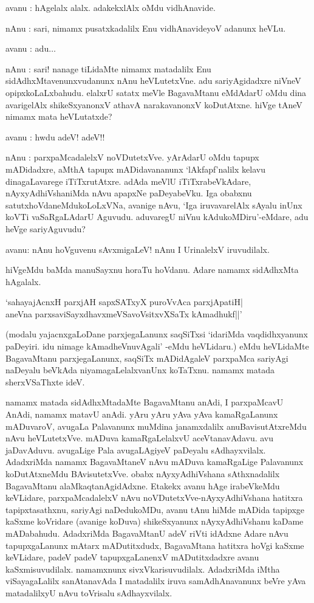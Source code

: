 avanu : hAgelalx alalx. adakekxlAlx oMdu vidhAnavide.

nAnu : sari, nimamx pusatxkadalilx Enu vidhAnavideyoV adanunx heVLu.

avanu : adu$\ldots$ 

nAnu : sari! nanage tiLidaMte nimamx matadalilx Enu sidAdhxMtavenunxvudanunx nAnu heVLutetxVne. adu sariyAgidadxre niVneV opipxkoLaLxbahudu. elalxrU satatx meVle BagavaMtanu eMdAdarU oMdu dina avarigelAlx shikeSxyanonxV athavA narakavanonxV koDutAtxne. hiVge tAneV 
nimamx mata heVLutatxde?

avanu : hwdu adeV! adeV!!

nAnu : parxpaMcadalelxV noVDutetxVve. yArAdarU oMdu tapupx mADidadxre, aMthA tapupx mADidavananunx `lAkfapf'nalilx kelavu dinagaLavarege iTiTxrutAtxre. adAda meVlU iTiTxrabeVkAdare, nAyxyAdhiVshaniMda nAvu apapxNe paDeyabeVku. Iga obabxnu satutxhoVdaneMdukoLoLxVNa, avanige nAvu, `Iga iruvavarelAlx sAyalu inUnx koVTi vaSaRgaLAdarU Aguvudu. aduvaregU niVnu kAdukoMDiru'-eMdare, adu heVge sariyAguvudu?

avanu: nAnu hoVguvenu sAvxmigaLeV! nAnu I UrinalelxV iruvudilalx.

hiVgeMdu baMda manuSayxnu horaTu hoVdanu. Adare namamx sidAdhxMta hAgalalx.

\begin{shloka}
`sahayajAcnxH parxjAH sapxSATxyX puroVvAca parxjApatiH|\\
aneVna parxsaviSayxdhavxmeVSavoV\s sitxvXSaTx kAmadhukf||'
\end{shloka}

(modalu yajacnxgaLoDane parxjegaLanunx saqSiTxsi `idariMda vaqdidhxyanunx paDeyiri. idu nimage kAmadheVnuvAgali' -eMdu heVLidaru.) eMdu heVLidaMte BagavaMtanu parxjegaLanunx, saqSiTx mADidAgaleV parxpaMca sariyAgi naDeyalu beVkAda niyamagaLelalxvanUnx koTaTxnu. 
namamx matada sherxVSaThxte ideV.

namamx matada sidAdhxMtadaMte BagavaMtanu anAdi, I parxpaMcavU AnAdi, namamx matavU anAdi. yAru yAru yAva yAva kamaRgaLanunx mADuvaroV, avugaLa Palavanunx muMdina janamxdalilx anuBavisutAtxreMdu nAvu heVLutetxVve. mADuva kamaRgaLelalxvU aceVtanavAdavu. avu jaDavAduvu. avugaLige Pala avugaLAgiyeV paDeyalu sAdhayxvilalx. AdadxriMda namamx BagavaMtaneV nAvu mADuva kamaRgaLige Palavanunx koDutAtxneMdu BAvisutetxVve. obabx nAyxyAdhiVshana sAthxnadalilx BagavaMtanu alaMkaqtanAgidAdxne. Etakekx avanu hAge irabeVkeMdu 
keVLidare, parxpaMcadalelxV nAvu noVDutetxVve-nAyxyAdhiVshana hatitxra tapipxtasathxnu, sariyAgi naDedukoMDu, avanu tAnu hiMde mADida tapipxge kaSxme koVridare (avanige koDuva) shikeSxyanunx nAyxyAdhiVshanu kaDame mADabahudu. AdadxriMda BagavaMtanU adeV riVti idAdxne Adare nAvu tapupxgaLanunx mAtarx mADutitxdudx, BagavaMtana hatitxra hoVgi kaSxme keVLidare, padeV padeV tapupxgaLanenxV mADutitxdadxre avanu kaSxmisuvudilalx. namamxnunx sivxVkarisuvudilalx. AdadxriMda iMtha viSayagaLalilx sanAtanavAda I matadalilx 
iruva samAdhAnavanunx beVre yAva matadalilxyU nAvu toVrisalu sAdhayxvilalx.

